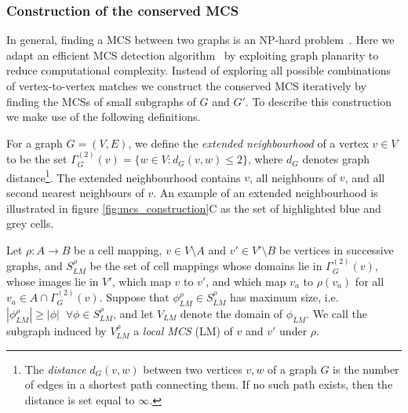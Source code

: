 \documentclass[a4paper,11pt]{article}
\begin{document}

\subsubsection*{Construction of the conserved MCS}

In general, finding a MCS between two graphs is an NP-hard problem~\cite{Ullmann1976}. 
Here we adapt an efficient MCS detection algorithm~\cite{Krissinel2004} by exploiting graph planarity to reduce computational complexity.
Instead of exploring all possible combinations of vertex-to-vertex matches \cite{Krissinel2004} we construct the conserved MCS iteratively by finding the MCSs of small subgraphs of $G$ and $G'$.
To describe this construction we make use of the following definitions. 

For a graph $G = (V,E)$, we define the \textit{extended neighbourhood} of a vertex $v \in V$ to be the set $\Gamma_{G}^{(2)}(v) = \{ w \in V : d_G(v, w) \leq 2 \}$, where $d_G$ denotes graph distance\footnote{The \textit{distance} $d_{G}(v,w)$ between two vertices $v, w$ of a graph $G$ is the number of edges in a shortest path connecting them. 
If no such path exists, then the distance is set equal to $\infty$.}. The extended neighbourhood contains $v$, all neighbours of $v$, and all second nearest neighbours of $v$. An example of an extended neighbourhood is illustrated in figure \ref{fig:mcs_construction}C as the set of highlighted blue and grey cells.
%
%
%
%

Let $\rho: A \rightarrow B$ be a cell mapping, $v \in V\setminus A$ and $v' \in V'\setminus B$ be vertices in successive graphs, and $S_{LM}^{\rho}$ be the set of cell mappings whose domains lie in $\Gamma_{G}^{(2)}(v)$, whose images lie in $V'$, which map $v$ to $v'$, and which map $v_a$ to $\rho(v_a)$ for all $v_a \in A \cap \Gamma^{(2)}_G(v)$. 
%
%
%
%
Suppose that $\phi_{LM}^\rho \in S_{LM}^{\rho}$ has maximum size, i.e. $|\phi_{LM}^\rho| \geq |\phi| \;\; \forall \phi \in S_{LM}^{\rho}$, and let $V_{LM}$ denote the domain of $\phi_{LM}$. 
We call the subgraph induced by $V_{LM}^\rho$ a \textit{local MCS} (LM) of $v$ and $v'$ under $\rho$. 
\end{document}
